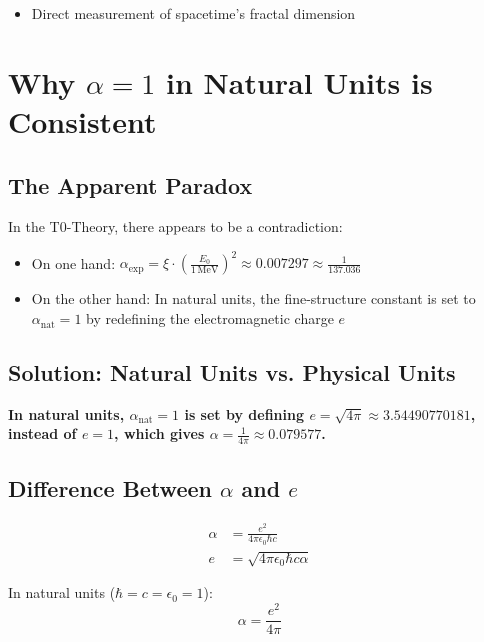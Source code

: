 \documentclass[12pt,a4paper]{article}
\theoremstyle{definition}
\begin{document}
\begin{itemize}
	\item Direct measurement of spacetime's fractal dimension
	

\end{itemize}
	
\section*{Why $\alpha = 1$ in Natural Units is Consistent}

\subsection*{The Apparent Paradox}

In the T0-Theory, there appears to be a contradiction:
\begin{itemize}
	\item On one hand: $\alpha_{\text{exp}} = \xi \cdot \left(\frac{E_0}{1 \, \text{MeV}}\right)^2 \approx 0.007297 \approx \frac{1}{137.036}$
	\item On the other hand: In natural units, the fine-structure constant is set to $\alpha_{\text{nat}} = 1$ by redefining the electromagnetic charge $e$
\end{itemize}

\subsection*{Solution: Natural Units vs. Physical Units}

\begin{tcolorbox}[colback=green!5!white,colframe=green!75!black]
	\textbf{In natural units, $\alpha_{\text{nat}} = 1$ is set by defining $e = \sqrt{4\pi} \approx 3.54490770181$, instead of $e = 1$, which gives $\alpha = \frac{1}{4\pi} \approx 0.079577$.}
\end{tcolorbox}

\subsection*{Difference Between $\alpha$ and $e$}

\begin{align*}
	\alpha &= \frac{e^2}{4\pi\epsilon_0\hbar c} \\
	e &= \sqrt{4\pi\epsilon_0\hbar c \alpha}
\end{align*}

In natural units ($\hbar = c = \epsilon_0 = 1$):
\[
\alpha = \frac{e^2}{4\pi}
\]
\end{document}
